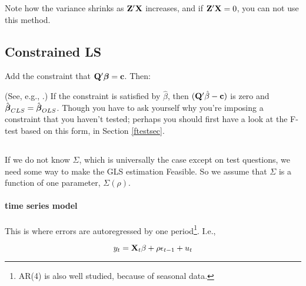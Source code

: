 
Note how the variance shrinks as ${\bf Z}'{\bf X}$ increases, and if
${\bf Z}'{\bf X}=0$, you can not use this method. 

\subsection{Constrained LS }

Add the constraint that ${\bf Q}'{\mbox{\boldmath$\beta$}}={\bf c}$. Then:

(See, e.g., \cite{amemiya:ez}.)
If the constraint is satisfied by $\hat\beta$, then
$({\bf Q}'\hat\beta-{\bf c})$ is zero and $\hat{{\mbox{\boldmath$\beta$}}}_{CLS}=\hat{{\mbox{\boldmath$\beta$}}}_{OLS}$.
Though you have to ask yourself why you're imposing a constraint that
you haven't tested; perhaps you should first have a look at the F-test
based on this form, in Section \ref{ftestsec}.

\subsection{}

If we do not know $\Sigma$, which is universally the case except on
test questions, we need some way to make the GLS estimation Feasible. So we
assume that $\Sigma$ is a function of one parameter, $\Sigma(\rho)$.

\label{ts}
\paragraph{ time series model}

This is where errors are autoregressed by one period\footnote{AR(4) is
also well studied, because of seasonal data.}. I.e.,

$$y_t={\bf X}_t\beta + \rho\epsilon_{t-1} + u_t$$

